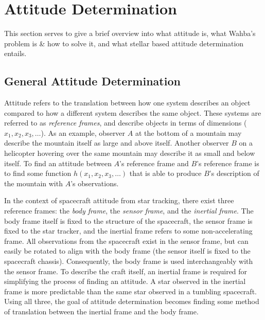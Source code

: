 \newcommand{\iFrame}{\mathcal{I}}
\newcommand{\kFrame}{\mathcal{K}}
\newcommand{\vv}[1]{#1} %

\section{Attitude Determination}\label{sec:attitudeDetermination}

This section serves to give a brief overview into what attitude is, what Wahba's problem is \& how to solve it, and what
stellar based attitude determination entails.

\subsection{General Attitude Determination}\label{subsec:generalAttitudeDetermination}
Attitude refers to the translation between how one system describes an object compared to how a different system
describes the same object.
These systems are referred to as \textit{reference frames}, and describe objects in terms of dimensions ($x_1, x_2, x_3,
\ldots$).
As an example, observer $A$ at the bottom of a mountain may describe the mountain itself as large and above itself.
Another observer $B$ on a helicopter hovering over the same mountain may describe it as small and below itself.
To find an attitude between $A$'s reference frame and $B$'s reference frame is to find some function $h(x_1, x_2, x_3,
\ldots)$ that is able to produce $B$'s description of the mountain with $A$'s observations.

In the context of spacecraft attitude from star tracking, there exist three reference frames: the \textit{body frame},
the \textit{sensor frame}, and the \textit{inertial frame}.
The body frame itself is fixed to the structure of the spacecraft, the sensor frame is fixed to the star tracker,
and the inertial frame refers to some non-accelerating frame.
All observations from the spacecraft exist in the sensor frame, but can easily be rotated to align with the body frame
(the sensor itself is fixed to the spacecraft chassis).
Consequently, the body frame is used interchangeably with the sensor frame.
To describe the craft itself, an inertial frame is required for simplifying the process of finding an attitude.
A star observed in the inertial frame is more predictable than the same star observed in a tumbling spacecraft.
Using all three, the goal of attitude determination becomes finding some method of translation between the inertial
frame and the body frame.

